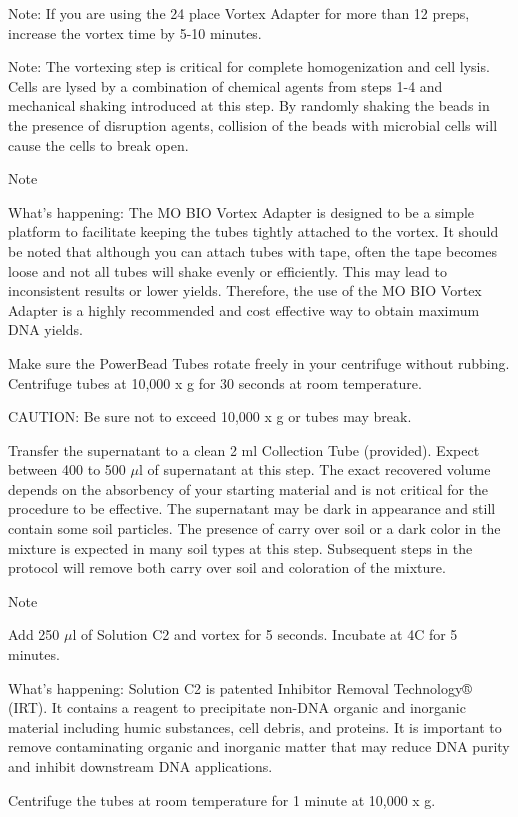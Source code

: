 \documentclass[12pt]{../SOP3_alpha}
\begin{document}
Note: If you are using the 24 place Vortex Adapter for more than 12 preps, increase the vortex time by 5-10 minutes. 

Note: The vortexing step is critical for complete homogenization and cell lysis. Cells are lysed by a combination of chemical agents from steps 1-4 and mechanical shaking introduced at this step. By randomly shaking the beads in the presence
of disruption agents, collision of the beads with microbial cells will cause the cells to break open.

Note

What's happening: The MO BIO Vortex Adapter is designed to be a simple platform to facilitate keeping the tubes tightly attached to the vortex. It should be noted that although you can attach tubes with tape, often the tape becomes loose and not all tubes will shake evenly or efficiently. This may lead to inconsistent results or lower yields. Therefore, the use of the MO BIO
Vortex Adapter is a highly recommended and cost effective way to obtain maximum DNA yields.

\NP Make sure the PowerBead Tubes rotate freely in your centrifuge without rubbing. Centrifuge tubes at 10,000 x g for 30 seconds at room temperature.

CAUTION: Be sure not to exceed 10,000 x g or tubes may break.

\NP Transfer the supernatant to a clean 2 ml Collection Tube (provided). Expect between 400 to 500 $\mu$l of supernatant at this step. The exact recovered volume depends on the absorbency of
your starting material and is not critical for the procedure to be effective. The supernatant may be dark in appearance and still contain some soil particles. The presence of carry over soil or a dark color in the mixture is expected in many
soil types at this step. Subsequent steps in the protocol will remove both carry over soil and coloration of the mixture.

Note

\NP Add 250 $\mu$l of Solution C2 and vortex for 5 seconds. Incubate at 4\degree C for 5
minutes.

What's happening: Solution C2 is patented Inhibitor Removal Technology® (IRT). It contains a reagent to precipitate non-DNA organic and inorganic material including humic substances, cell debris, and proteins. It is important to remove contaminating organic and inorganic matter that may reduce
DNA purity and inhibit downstream DNA applications.

\NP Centrifuge the tubes at room temperature for 1 minute at 10,000 x g.
\end{document}
